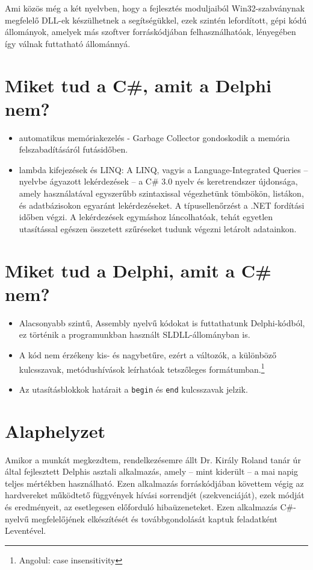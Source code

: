 \documentclass[tocnopagenum]{thesis-ekf}
\theoremstyle{definition}
\theoremstyle{remark}
\begin{document}
	Ami közös még a két nyelvben, hogy a fejlesztés moduljaiból Win32-szabványnak megfelelő DLL-ek készülhetnek a segítségükkel, ezek szintén lefordított, gépi kódú állományok, amelyek más szoftver forráskódjában felhasználhatóak, lényegében így válnak futtatható állománnyá.
	
	\section{Miket tud a C\#, amit a Delphi nem?}
	\begin{itemize}
		\item automatikus memóriakezelés - Garbage Collector gondoskodik a memória felszabadításáról futásidőben.
		\item lambda kifejezések és LINQ: A LINQ, vagyis a Language-Integrated Queries -- nyelvbe ágyazott lekérdezések -- a C\# 3.0 nyelv és keretrendszer újdonsága, amely használatával egyszerűbb szintaxissal végezhetünk tömbökön, listákon, és adatbázisokon egyaránt lekérdezéseket. A típusellenőrzést a .NET fordítási időben végzi. A lekérdezések egymáshoz láncolhatóak, tehát egyetlen utasítással egészen összetett szűréseket tudunk végezni letárolt adatainkon. \cite{linq}
	\end{itemize}
	\section{Miket tud a Delphi, amit a C\# nem?}
	\begin{itemize}
		\item Alacsonyabb szintű, Assembly nyelvű kódokat is futtathatunk Delphi-kódból, ez történik a programunkban használt SLDLL-állományban is.
		\item A kód nem érzékeny kis- és nagybetűre, ezért a változók, a különböző kulcsszavak, metódushívások leírhatóak tetszőleges formátumban.\footnote{Angolul: case insensitivity}
		\item Az utasításblokkok határait a \verb*|begin| és \verb*|end| kulcsszavak jelzik.
	\end{itemize}\cite{pascal_csharp}
	\section{Alaphelyzet}
	Amikor a munkát megkezdtem, rendelkezésemre állt Dr. Király Roland tanár úr által fejlesztett Delphis asztali alkalmazás, amely -- mint kiderült -- a mai napig teljes mértékben használható. Ezen alkalmazás forráskódjában követtem végig az hardvereket működtető függvények hívási sorrendjét (szekvenciáját), ezek módját és eredményeit, az esetlegesen előforduló hibaüzeneteket. 
	Ezen alkalmazás C\#-nyelvű megfelelőjének elkészítését és továbbgondolását kaptuk feladatként Leventével.
\end{document}
